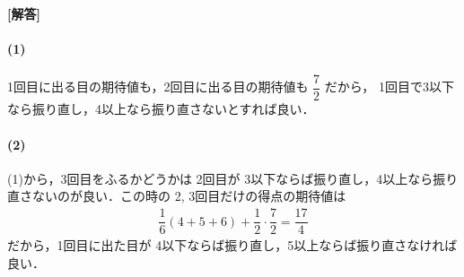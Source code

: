 \documentclass[../../main.tex]{subfiles}
\begin{document}
\begin{oframed}
  
\end{oframed}

{\bf [解答]}
\paragraph{(1)}

1回目に出る目の期待値も，2回目に出る目の期待値も $\dfrac{7}{2}$ だから，
1回目で3以下なら振り直し，4以上なら振り直さないとすれば良い．

\paragraph{(2)}

(1)から，3回目をふるかどうかは 2回目が 3以下ならば振り直し，4以上なら振り直さないのが良い．この時の 2, 3回目だけの得点の期待値は
\begin{align}
  \dfrac{1}{6}(4+5+6) + \dfrac{1}{2} \cdot \dfrac{7}{2} = \dfrac{17}{4}
\end{align}
だから，1回目に出た目が 4以下ならば振り直し，5以上ならば振り直さなければ良い．

\newpage
\end{document}
